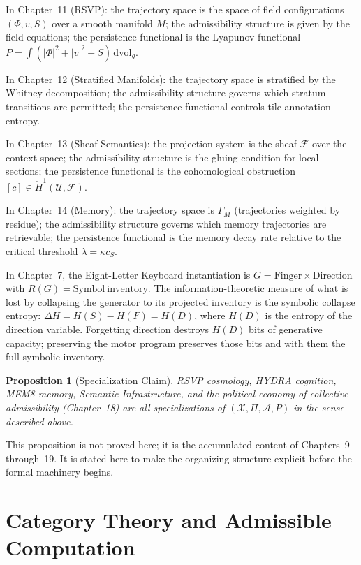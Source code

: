\documentclass[12pt, oneside]{book}
\theoremstyle{flyxion}
\newtheorem{proposition}[theorem]{Proposition}
\theoremstyle{definition}
\begin{document}
In Chapter~11 (RSVP): the trajectory space is the space
of field configurations $(\Phi, v, S)$ over a smooth
manifold $M$; the admissibility structure is given by the
field equations; the persistence functional is the
Lyapunov functional $P = \int (|\Phi|^2 + |v|^2 + S)\,
\mathrm{dvol}_g$.

In Chapter~12 (Stratified Manifolds): the trajectory space
is stratified by the Whitney decomposition; the admissibility
structure governs which stratum transitions are permitted;
the persistence functional controls tile annotation entropy.

In Chapter~13 (Sheaf Semantics): the projection system is
the sheaf $\mathcal{F}$ over the context space; the
admissibility structure is the gluing condition for local
sections; the persistence functional is the cohomological
obstruction $[c] \in \check{H}^1(\mathcal{U}, \mathcal{F})$.

In Chapter~14 (Memory): the trajectory space is
$\Gamma_M$ (trajectories weighted by residue); the
admissibility structure governs which memory trajectories
are retrievable; the persistence functional is the
memory decay rate relative to the critical threshold
$\lambda = \kappa c_S$.

In Chapter~7, the Eight-Letter Keyboard instantiation is
$G = \mathrm{Finger} \times \mathrm{Direction}$ with
$R(G) = \mathrm{Symbol\ inventory}$. The information-theoretic
measure of what is lost by collapsing the generator to its
projected inventory is the symbolic collapse entropy:
$\Delta H = H(S) - H(F) = H(D)$, where $H(D)$ is the entropy
of the direction variable. Forgetting direction destroys
$H(D)$ bits of generative capacity; preserving the motor
program preserves those bits and with them the full symbolic
inventory.

\begin{proposition}[Specialization Claim]
\label{prop:specialization}
RSVP cosmology, HYDRA cognition, MEM\textbar{}8 memory,
Semantic Infrastructure, and the political economy of
collective admissibility (Chapter~18) are all
specializations of $(\mathcal{X}, \Pi, \mathcal{A}, P)$
in the sense described above.
\end{proposition}

This proposition is not proved here; it is the accumulated
content of Chapters~9 through~19. It is stated here to
make the organizing structure explicit before the formal
machinery begins.

\chapter{Category Theory and Admissible Computation}
\end{document}
